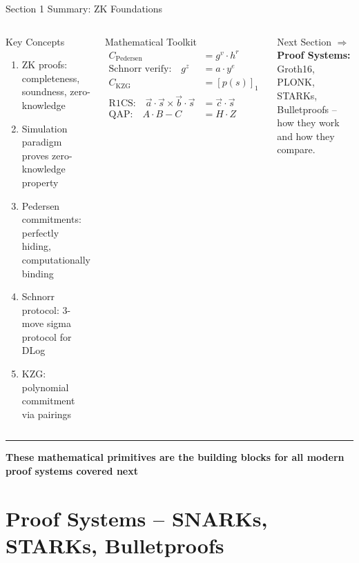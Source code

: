 \documentclass[8pt,aspectratio=169]{beamer}
\newcommand{\bottomnote}[1]{\vfill\vspace{-2mm}\textcolor{mllavender2}{\rule{\textwidth}{0.4pt}}\vspace{1mm}\footnotesize\textbf{#1}}
\begin{document}
\begin{frame}{Section 1 Summary: ZK Foundations}
\begin{columns}[T]
\begin{block}{Key Concepts}
\footnotesize
\begin{enumerate}
  \item ZK proofs: completeness, soundness, zero-knowledge
  \item Simulation paradigm proves zero-knowledge property
  \item Pedersen commitments: perfectly hiding, computationally binding
  \item Schnorr protocol: 3-move sigma protocol for DLog
  \item KZG: polynomial commitment via pairings
\end{enumerate}
\end{block}

\begin{block}{Mathematical Toolkit}
\footnotesize
\begin{align}
C_{\text{Pedersen}} &= g^v \cdot h^r \\
\text{Schnorr verify:}\quad g^z &= a \cdot y^e \\
C_{\text{KZG}} &= [p(s)]_1 \\
\text{R1CS:}\quad \vec{a} \cdot \vec{s} \times \vec{b} \cdot \vec{s} &= \vec{c} \cdot \vec{s} \\
\text{QAP:}\quad A \cdot B - C &= H \cdot Z
\end{align}
\end{block}
\vspace{2mm}
\begin{exampleblock}{\footnotesize Next Section}
\footnotesize
$\Rightarrow$ \textbf{Proof Systems:} Groth16, PLONK, STARKs, Bulletproofs -- how they work and how they compare.
\end{exampleblock}
\end{columns}
\bottomnote{These mathematical primitives are the building blocks for all modern proof systems covered next}
\end{frame}

\section{Proof Systems -- SNARKs, STARKs, Bulletproofs}
\end{document}

